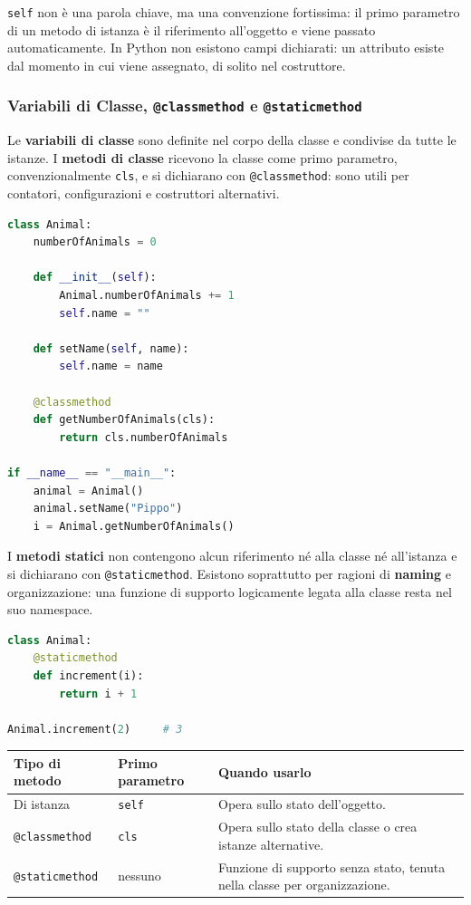 \documentclass[12pt]{extarticle}
\begin{document}
\noindent \texttt{self} non è una parola chiave, ma una convenzione fortissima: il primo parametro di un metodo di istanza è il riferimento all'oggetto e viene passato automaticamente. In Python non esistono campi dichiarati: un attributo esiste dal momento in cui viene assegnato, di solito nel costruttore.

\subsubsection{Variabili di Classe, \texttt{@classmethod} e \texttt{@staticmethod}}

\noindent Le \textbf{variabili di classe} sono definite nel corpo della classe e condivise da tutte le istanze. I \textbf{metodi di classe} ricevono la classe come primo parametro, convenzionalmente \texttt{cls}, e si dichiarano con \texttt{@classmethod}: sono utili per contatori, configurazioni e costruttori alternativi.

\begin{lstlisting}[language=Python]
class Animal:
    numberOfAnimals = 0

    def __init__(self):
        Animal.numberOfAnimals += 1
        self.name = ""

    def setName(self, name):
        self.name = name

    @classmethod
    def getNumberOfAnimals(cls):
        return cls.numberOfAnimals

if __name__ == "__main__":
    animal = Animal()
    animal.setName("Pippo")
    i = Animal.getNumberOfAnimals()
\end{lstlisting}

\noindent I \textbf{metodi statici} non contengono alcun riferimento né alla classe né all'istanza e si dichiarano con \texttt{@staticmethod}. Esistono soprattutto per ragioni di \textbf{naming} e organizzazione: una funzione di supporto logicamente legata alla classe resta nel suo namespace.

\begin{lstlisting}[language=Python]
class Animal:
    @staticmethod
    def increment(i):
        return i + 1

Animal.increment(2)     # 3
\end{lstlisting}

\begin{center}
\small
\begin{tabular}{p{3.6cm}p{4.2cm}p{6.0cm}}
    \toprule
    \textbf{Tipo di metodo} & \textbf{Primo parametro} & \textbf{Quando usarlo} \\
    \midrule
    Di istanza & \texttt{self} & Opera sullo stato dell'oggetto. \\
    \addlinespace
    \texttt{@classmethod} & \texttt{cls} & Opera sullo stato della classe o crea istanze alternative. \\
    \addlinespace
    \texttt{@staticmethod} & nessuno & Funzione di supporto senza stato, tenuta nella classe per organizzazione. \\
    \bottomrule
\end{tabular}
\end{center}
\end{document}

